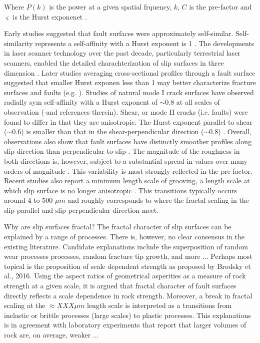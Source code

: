 \documentclass[12pt,a4paper]{article}
\begin{document}
Where $P(k)$ is the power at a given spatial frquency, $k$, $C$ is the pre-factor and $\varsigma$ is the Hurst exponenet \cite{mandelbrot1985self, power1991euclidean, schmittbuhl1993field, candela2012roughness}. 

Early studies suggested that fault surfaces were approximately self-similar. Self-similarity represents a self-affinity with a Hurst exponent is 1 \cite{mandelbrot1985self}. The developments in laser scanner technology over the past decade, particularly terrestrial laser scanners, enabled the detailed charachterization of slip surfaces in three dimension \cite{lee1996structural, kokkalas2007quantitative, renard2006high, sagy2007evolution, sagy2009geometric, jones2009quantitative, bistacchi2011fault, brodsky2011faults, candela2012roughness}. Later studies averaging cross-sectional profiles through a fault surface suggested that smaller Hurst exponen less than 1 may better characterize fracture surfaces and faults (e.g. \cite{schmittbuhl1993field, lee1996structural, sagy2009geometric, candela2012roughness}). Studies of natural mode I crack surfaces have observed radially sym self-affinity with a Hurst exponent of $\sim$0.8 at all scales of observation (\cite{schmittbuhl1995scaling, bouchaud1997scaling}-and references therein). Shear, or mode II cracks (i.e. faults) were found to differ in that they are anisotropic. The Hurst exponent parallel to shear ($\sim$0.6) is smaller than that in the shear-perpendicular direction ($\sim$0.8) \cite{lee1996structural, sagy2007evolution, bistacchi2011fault, candela2012roughness}. Overall, observations also show that fault surfaces have distinctly smoother profiles along slip direction than perpendicular to slip \cite{lee1996structural, sagy2007geometric, candela2012roughness}. The magnitude of the roughness in both directions is, however, subject to a substantial spread in values over many orders of magnitude \cite{candela2012roughness, brodsky2011faults}. This variability is most strongly reflected in the pre-factor. Recent studies also report a minimum length scale of grooving, a length scale at which slip surface is no longer anisotropic \cite{candela2016minimum, brodsky2016constraints}. This transitions typically occurs around 4 to 500 $\mu m$ and roughly corresponds to where the fractal scaling in the slip parallel and slip perpendicular direction meet.

Why are slip surfaces fractal? The fractal character of slip surfaces can be explained by a range of processes. There is, however, no clear consensus in the existing literature. Candidate explanations include the superposition of random wear processes processes, random fracture tip growth, and more ... Perhaps most topical is the proposition of scale dependent strength as proposed by Brodsky et al., 2016. Using the aspect ratios of geometrical asperities as a measure of rock strength at a given scale, it is argued that fractal character of fault surfaces directly reflects a scale dependence in rock strength. Moreover, a break in fractal scaling at the $\approx XXX \mu m$ length scale is interpreted as a transitions from inelastic or brittle processes (large scales) to plastic processes. This explanations is in agreement with laboratory experiments that report that larger volumes of rock are, on average, weaker ...
\end{document}
